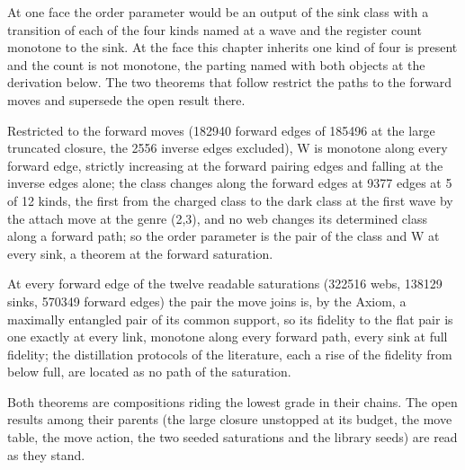 At one face the order parameter would be an output of the sink class with a transition of each of the four kinds named at a wave and the register count monotone to the sink. At the face this chapter inherits one kind of four is present and the count is not monotone, the parting named with both objects at the derivation below. The two theorems that follow restrict the paths to the forward moves and supersede the open result there.
\begin{chtheorem}\label{box:XI-4-order-parameter-at-the-stop-condition:2}
Restricted to the forward moves (182940 forward edges of 185496 at the large truncated closure, the 2556 inverse edges excluded), W is monotone along every forward edge, strictly increasing at the forward pairing edges and falling at the inverse edges alone; the class changes along the forward edges at 9377 edges at 5 of 12 kinds, the first from the charged class to the dark class at the first wave by the attach move at the genre (2,3), and no web changes its determined class along a forward path; so the order parameter is the pair of the class and W at every sink, a theorem at the forward saturation.
\end{chtheorem}
\begin{chtheorem}\label{box:XI-4-order-parameter-at-the-stop-condition:3}
At every forward edge of the twelve readable saturations (322516 webs, 138129 sinks, 570349 forward edges) the pair the move joins is, by the Axiom, a maximally entangled pair of its common support, so its fidelity to the flat pair is one exactly at every link, monotone along every forward path, every sink at full fidelity; the distillation protocols of the literature, each a rise of the fidelity from below full, are located as no path of the saturation.
\end{chtheorem}
Both theorems are compositions riding the lowest grade in their chains. The open results among their parents (the large closure unstopped at its budget, the move table, the move action, the two seeded saturations and the library seeds) are read as they stand.
